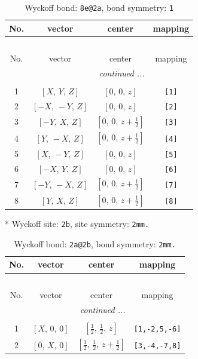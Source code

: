 \documentclass[fleqn,8pt]{jsarticle}
\begin{document}
\renewcommand{\arraystretch}{1.2}
\begin{longtable}{cccc}
\caption{Wyckoff bond: {\tt 8e@2a}, bond symmetry: {\tt 1}}
 \\
 \hline \hline
No. & vector & center & mapping \\ \hline \endfirsthead

\multicolumn{3}{l}{\tablename\ \thetable{}} \\
 \hline \hline
No. & vector & center & mapping \\ \hline \endhead

 \hline \hline
\multicolumn{3}{r}{\footnotesize\it continued ...} \\ \endfoot

 \hline \hline
\multicolumn{3}{r}{} \\ \endlastfoot

1 & $\left[ X,\, Y,\, Z \right]$ & $\left[ 0,\, 0,\, z \right]$ & {\tt [1]} \\ \hline
2 & $\left[ - X,\, - Y,\, Z \right]$ & $\left[ 0,\, 0,\, z \right]$ & {\tt [2]} \\ \hline
3 & $\left[ - Y,\, X,\, Z \right]$ & $\left[ 0,\, 0,\, z + \frac{1}{2} \right]$ & {\tt [3]} \\ \hline
4 & $\left[ Y,\, - X,\, Z \right]$ & $\left[ 0,\, 0,\, z + \frac{1}{2} \right]$ & {\tt [4]} \\ \hline
5 & $\left[ X,\, - Y,\, Z \right]$ & $\left[ 0,\, 0,\, z \right]$ & {\tt [5]} \\ \hline
6 & $\left[ - X,\, Y,\, Z \right]$ & $\left[ 0,\, 0,\, z \right]$ & {\tt [6]} \\ \hline
7 & $\left[ - Y,\, - X,\, Z \right]$ & $\left[ 0,\, 0,\, z + \frac{1}{2} \right]$ & {\tt [7]} \\ \hline
8 & $\left[ Y,\, X,\, Z \right]$ & $\left[ 0,\, 0,\, z + \frac{1}{2} \right]$ & {\tt [8]} \\
\end{longtable}
* Wyckoff site: {\tt 2b}, site symmetry: {\tt 2mm.}
\renewcommand{\arraystretch}{1.2}
\begin{longtable}{cccc}
\caption{Wyckoff bond: {\tt 2a@2b}, bond symmetry: {\tt 2mm.}}
 \\
 \hline \hline
No. & vector & center & mapping \\ \hline \endfirsthead

\multicolumn{3}{l}{\tablename\ \thetable{}} \\
 \hline \hline
No. & vector & center & mapping \\ \hline \endhead

 \hline \hline
\multicolumn{3}{r}{\footnotesize\it continued ...} \\ \endfoot

 \hline \hline
\multicolumn{3}{r}{} \\ \endlastfoot

1 & $\left[ X,\, 0,\, 0 \right]$ & $\left[ \frac{1}{2},\, \frac{1}{2},\, z \right]$ & {\tt [1,-2,5,-6]} \\ \hline
2 & $\left[ 0,\, X,\, 0 \right]$ & $\left[ \frac{1}{2},\, \frac{1}{2},\, z + \frac{1}{2} \right]$ & {\tt [3,-4,-7,8]} \\
\end{longtable}
\end{document}
